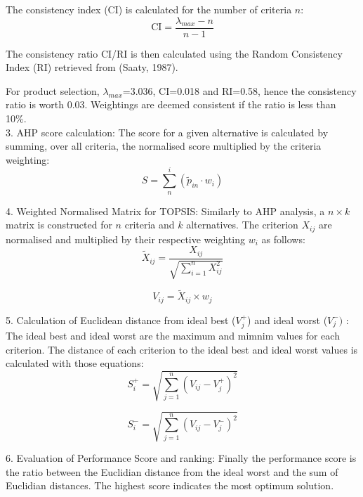 The consistency index (CI) is calculated for the number of criteria $n$:
\begin{equation}
   \mathrm{CI} = \frac{\lambda_{max}-n}{n-1}
\end{equation}

The consistency ratio CI/RI is then calculated using the Random Consistency Index (RI) retrieved from (Saaty, 1987). 

For product selection, $\lambda_{max}$=3.036, CI=0.018 and RI=0.58, hence the consistency ratio is worth 0.03. Weightings are deemed consistent if the ratio is less than 10\%.\\

3. AHP score calculation: The score for a given alternative is calculated by summing, over all criteria, the normalised score multiplied by the criteria weighting:
\begin{equation}
    S=\sum^{i}_{n}(\tilde{p}_{in} \cdot w_{i})
\end{equation}

4. Weighted Normalised Matrix for TOPSIS:
Similarly to AHP analysis, a $n\times k$ matrix is constructed for $n$ criteria and $k$ alternatives. The criterion $X_{ij}$ are normalised and multiplied by their respective weighting $w_i$ as follows:
\begin{equation}
    \tilde{X}_{ij}=\frac{X_{ij}}{\sqrt{\sum^{n}_{i=1}X_{ij}^{2}}}
\end{equation}

\begin{equation}
    V_{ij}=\tilde{X}_{ij}\times w_j
\end{equation}

5. Calculation of Euclidean distance from ideal best ($V_{j}^{+}$) and ideal worst ($V_{j}^{-})$ :
The ideal best and ideal worst are the maximum and mimnim values for each criterion. The distance of each criterion to the ideal best and ideal worst values is calculated with those equations:
\begin{equation}
    S_{i}^{+}=\sqrt{\sum_{j=1}^{n}(V_{ij}-V_{j}^{+})^2}
\end{equation}

\begin{equation}
    S_{i}^{-}=\sqrt{\sum_{j=1}^{n}(V_{ij}-V_{j}^{-})^2}
\end{equation}

6. Evaluation of Performance Score and ranking:
Finally the performance score is the ratio between the Euclidian distance from the ideal worst and the sum of Euclidian distances. The highest score indicates the most optimum solution.

